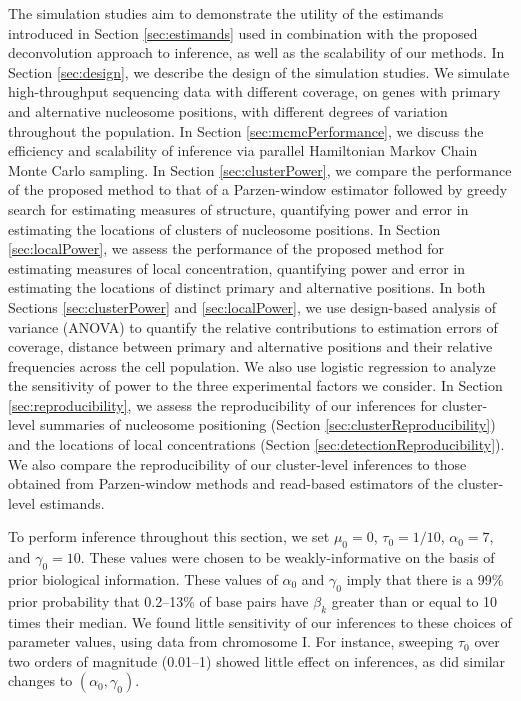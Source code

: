 The simulation studies aim to demonstrate the utility of the estimands introduced in Section \ref{sec:estimands} used in combination with the proposed deconvolution approach to inference, as well as the scalability of our methods.
In Section \ref{sec:design}, we describe the design of the simulation studies. 
We simulate high-throughput sequencing data with different coverage, on genes with primary and alternative nucleosome positions, with different degrees of variation throughout the population. 
In Section \ref{sec:mcmcPerformance}, we discuss the efficiency and scalability of inference via parallel Hamiltonian Markov Chain Monte Carlo sampling.
In Section \ref{sec:clusterPower}, we compare the performance of the proposed method to that of a Parzen-window estimator followed by greedy search \citep[the standard in the field;][]{Albert2007,Shivaswamy2008,Tsankov2010,Tirosh2012} for estimating measures of structure, quantifying power and error in estimating the locations of clusters of nucleosome positions.
In Section \ref{sec:localPower}, we assess the performance of the proposed method for estimating measures of local concentration, quantifying power and error in estimating the locations of distinct primary and alternative positions.
%
In both Sections \ref{sec:clusterPower} and \ref{sec:localPower}, we use design-based analysis of variance (ANOVA) to quantify the relative contributions to estimation errors of coverage, distance between primary and alternative positions and their relative frequencies across the cell population.
We also use logistic regression to analyze the sensitivity of power to the three experimental factors we consider.
%
In Section \ref{sec:reproducibility}, we assess the reproducibility of our inferences for cluster-level summaries of nucleosome positioning (Section \ref{sec:clusterReproducibility}) and the locations of local concentrations (Section \ref{sec:detectionReproducibility}).
We also compare the reproducibility of our cluster-level inferences to those obtained from Parzen-window methods and read-based estimators of the cluster-level estimands.

To perform inference throughout this section, we set $\mu_0 = 0$, $\tau_0 = 1/10$, $\alpha_0 = 7$, and $\gamma_0 = 10$.
These values were chosen to be weakly-informative on the basis of prior biological information.
These values of $\alpha_0$ and $\gamma_0$ imply that there is a 99\% prior probability that 0.2--13\% of base pairs have $\beta_k$ greater than or equal to 10 times their median.
%
We found little sensitivity of our inferences to these choices of parameter values, using data from chromosome I.
For instance, sweeping $\tau_0$ over two orders of magnitude (0.01--1) showed little effect on inferences, as did similar changes to $(\alpha_0, \gamma_0)$.

